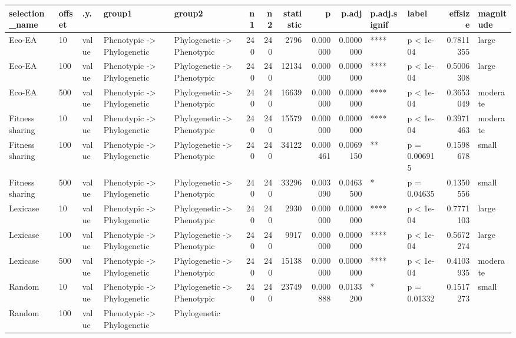 \documentclass[]{book}
\begin{document}
\begin{table}
\centering
\begin{tabular}[t]{l|l|l|l|l|r|r|r|r|r|l|l|r|l}
\hline
selection\_name & offset & .y. & group1 & group2 & n1 & n2 & statistic & p & p.adj & p.adj.signif & label & effsize & magnitude\\
\hline
Eco-EA & 10 & value & Phenotypic
    ->
Phylogenetic & Phylogenetic
    ->
Phenotypic & 240 & 240 & 2796 & 0.000000 & 0.0000000 & **** & p < 1e-04 & 0.7811355 & large\\
\hline
Eco-EA & 100 & value & Phenotypic
    ->
Phylogenetic & Phylogenetic
    ->
Phenotypic & 240 & 240 & 12134 & 0.000000 & 0.0000000 & **** & p < 1e-04 & 0.5006308 & large\\
\hline
Eco-EA & 500 & value & Phenotypic
    ->
Phylogenetic & Phylogenetic
    ->
Phenotypic & 240 & 240 & 16639 & 0.000000 & 0.0000000 & **** & p < 1e-04 & 0.3653049 & moderate\\
\hline
Fitness sharing & 10 & value & Phenotypic
    ->
Phylogenetic & Phylogenetic
    ->
Phenotypic & 240 & 240 & 15579 & 0.000000 & 0.0000000 & **** & p < 1e-04 & 0.3971463 & moderate\\
\hline
Fitness sharing & 100 & value & Phenotypic
    ->
Phylogenetic & Phylogenetic
    ->
Phenotypic & 240 & 240 & 34122 & 0.000461 & 0.0069150 & ** & p = 0.006915 & 0.1598678 & small\\
\hline
Fitness sharing & 500 & value & Phenotypic
    ->
Phylogenetic & Phylogenetic
    ->
Phenotypic & 240 & 240 & 33296 & 0.003090 & 0.0463500 & * & p = 0.04635 & 0.1350556 & small\\
\hline
Lexicase & 10 & value & Phenotypic
    ->
Phylogenetic & Phylogenetic
    ->
Phenotypic & 240 & 240 & 2930 & 0.000000 & 0.0000000 & **** & p < 1e-04 & 0.7771103 & large\\
\hline
Lexicase & 100 & value & Phenotypic
    ->
Phylogenetic & Phylogenetic
    ->
Phenotypic & 240 & 240 & 9917 & 0.000000 & 0.0000000 & **** & p < 1e-04 & 0.5672274 & large\\
\hline
Lexicase & 500 & value & Phenotypic
    ->
Phylogenetic & Phylogenetic
    ->
Phenotypic & 240 & 240 & 15138 & 0.000000 & 0.0000000 & **** & p < 1e-04 & 0.4103935 & moderate\\
\hline
Random & 10 & value & Phenotypic
    ->
Phylogenetic & Phylogenetic
    ->
Phenotypic & 240 & 240 & 23749 & 0.000888 & 0.0133200 & * & p = 0.01332 & 0.1517273 & small\\
\hline
Random & 100 & value & Phenotypic
    ->
Phylogenetic & Phylogenetic

\end{tabular}
\end{table}
\end{document}

